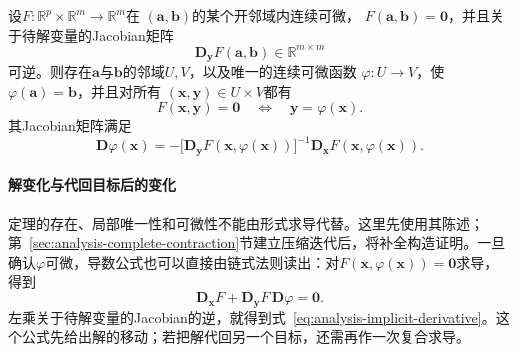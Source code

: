 \begin{theorem}[隐函数定理]
\label{thm:analysis-implicit-function}
设$F:\mathbb{R}^p\times\mathbb{R}^m\to\mathbb{R}^m$在 $(\bm{a},\bm{b})$的某个开邻域内连续可微， $F(\bm{a},\bm{b})=\bm{0}$，并且关于待解变量的Jacobian矩阵 \[   \bm{D}_{\bm{y}}F(\bm{a},\bm{b})   \in\mathbb{R}^{m\times m} \]
可逆。则存在$\bm{a}$与$\bm{b}$的邻域$U,V$，以及唯一的连续可微函数
$\varphi:U\to V$，使$\varphi(\bm{a})=\bm{b}$，并且对所有
$(\bm{x},\bm{y})\in U\times V$都有
\[
  F(\bm{x},\bm{y})=\bm{0}
  \quad\Longleftrightarrow\quad
  \bm{y}=\varphi(\bm{x}).
\]
其Jacobian矩阵满足
\begin{equation}
  \bm{D}\varphi(\bm{x})
  =
  -
  \bigl[\bm{D}_{\bm{y}}F(\bm{x},\varphi(\bm{x}))\bigr]^{-1}
  \bm{D}_{\bm{x}}F(\bm{x},\varphi(\bm{x})).
\label{eq:analysis-implicit-derivative}
\end{equation}
\end{theorem}

\paragraph{解变化与代回目标后的变化}

定理的存在、局部唯一性和可微性不能由形式求导代替。这里先使用其陈述；第~\ref{sec:analysis-complete-contraction}节建立压缩迭代后，将补全构造证明。一旦确认$\varphi$可微，导数公式也可以直接由链式法则读出：对$F(\bm x,\varphi(\bm x))=\bm0$求导，得到
\[
 \bm D_{\bm x}F+\bm D_{\bm y}F\,\bm D\varphi=\bm0.
\]
左乘关于待解变量的Jacobian的逆，就得到式~\eqref{eq:analysis-implicit-derivative}。这个公式先给出解的移动；若把解代回另一个目标，还需再作一次复合求导。



